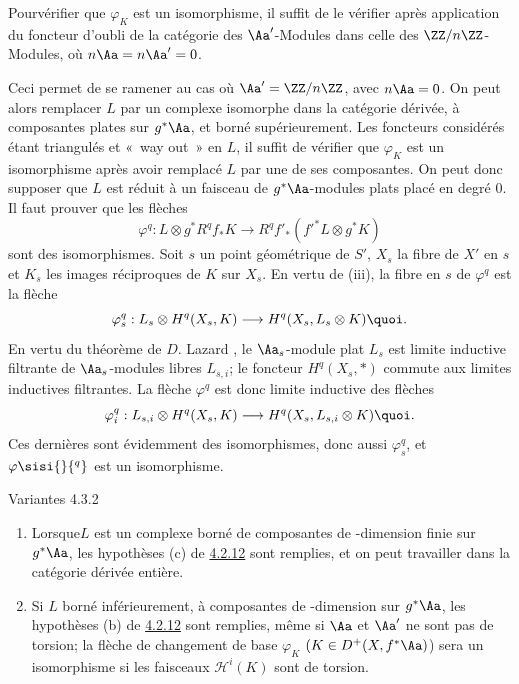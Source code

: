 \documentclass[10pt]{../fichiers-configuration-latex/smfart}
\begin{document}
Pour\pageoriginale vérifier que $\varphi_{K}$ est un isomorphisme,
il suffit de le vérifier après application du foncteur d'oubli de la catégorie des
$\Aa'$-Modules dans celle des
$\ZZ/n\ZZ$-Modules, où $n\Aa=n\Aa'=0$.

Ceci permet de se ramener au cas où
$\Aa'=\ZZ/n\ZZ$, avec $n\Aa=0$. On peut
alors remplacer $L$ par un complexe isomorphe dans la catégorie
dérivée, à composantes plates sur $g^{\ast}\Aa$, et borné
supérieurement. Les foncteurs considérés étant triangulés et « way
out »  en $L$, il suffit de vérifier que $\varphi_{K}$ est un
isomorphisme après avoir remplacé $L$ par une de ses composantes. On
peut donc supposer que $L$ est réduit à un faisceau de
$g^{\ast}\Aa$-modules plats placé en degré $0$. Il faut
prouver que les flèches
\[
\varphi^{q}:L\otimes g^{\ast}R^{q}f_{\ast}K\longrightarrow
R^{q}f'_{\ast}({f'}^{\ast}L\otimes g^{\ast}K)
\]
sont des isomorphismes. Soit $s$ un point géométrique de $S'$, $X_s$
la fibre de $X'$ en $s$ et $K_s$ les images réciproques de $K$ sur
$X_s$. En vertu de  (iii), la fibre en $s$ de $\varphi^{q}$ est
la flèche
\[
\varphi^{q}_s:L_{s}\otimes H^{q}(X_s,K)\longrightarrow H^{q}(X_s,
L_s\otimes K){\quoi}.
\]
En vertu du théorème de $D$. Lazard \cite{SGA4-17:La}, le $\Aa_s$-module
plat $L_s$ est limite inductive filtrante de $\Aa_s$-modules
libres $L_{s,i}$; le foncteur $H^{q}(X_s,\ast)$ commute aux limites
inductives filtrantes. La flèche $\varphi^{q}$ est donc limite
inductive des flèches
\[
\varphi^{q}_i:L_{s,i}\otimes H^{q}(X_s,K)\longrightarrow H^{q}(X_s,
L_{s,i}\otimes K){\quoi}.
\]
Ces dernières sont évidemment des isomorphismes, donc aussi
$\varphi^{q}_s$, et $\varphi\sisi{}{^q}$ est un isomorphisme.

\begin{enonce*}[remark]{Variantes 4.3.2}
\begin{enumerate}
\renewcommand{\theenumi}{\roman{enumi}}
\renewcommand{\labelenumi}{(\theenumi)}
\item Lorsque\pageoriginale $L$ est un complexe borné de composantes
de \tTor-dimension finie sur $g^{\ast}\Aa$, les hypothèses (c) de
\hyperref[XVII.subsubsec4.2.12]{4.2.12} sont remplies, et on peut travailler dans
la catégorie dérivée entière.

\item Si $L$ borné inférieurement, à composantes de \tTor-dimension 
sur $g^{\ast}\Aa$, les hypothèses (b) de \hyperref[XVII.subsubsec4.2.12]{4.2.12} sont remplies,
même si $\Aa$ et $\Aa'$ ne sont pas de torsion; la
flèche de changement de base $\varphi_{K}$ $(K\in
D^{+}(X,f^{\ast}\Aa)$) sera un isomorphisme si les faisceaux
$ℋ^{i}(K)$ sont de torsion.
\end{enumerate}
\end{enonce*}
\end{document}
